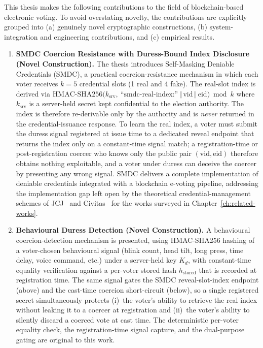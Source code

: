 This thesis makes the following contributions to the field of blockchain-based electronic voting. To avoid overstating novelty, the contributions are explicitly grouped into (a) genuinely novel cryptographic constructions, (b) system-integration and engineering contributions, and (c) empirical results.

\begin{enumerate}
    \item \textbf{SMDC Coercion Resistance with Duress-Bound Index Disclosure (Novel Construction).} The thesis introduces Self-Masking Deniable Credentials (SMDC), a practical coercion-resistance mechanism in which each voter receives $k=5$ credential slots (1 real and 4 fake). The real-slot index is derived via $\text{HMAC-SHA256}\bigl(k_{\text{srv}},\ \text{``smdc-real-index:''} \,\Vert\, \text{vid} \,\Vert\, \text{eid}\bigr) \bmod k$ where $k_{\text{srv}}$ is a server-held secret kept confidential to the election authority. The index is therefore re-derivable only by the authority and is \emph{never} returned in the credential-issuance response. To learn the real index, a voter must submit the duress signal registered at issue time to a dedicated reveal endpoint that returns the index only on a constant-time signal match; a registration-time or post-registration coercer who knows only the public pair $(\text{vid}, \text{eid})$ therefore obtains nothing exploitable, and a voter under duress can deceive the coercer by presenting any wrong signal. SMDC delivers a complete implementation of deniable credentials integrated with a blockchain e-voting pipeline, addressing the implementation gap left open by the theoretical credential-management schemes of JCJ~\cite{jcj2005} and Civitas~\cite{civitas2008} for the works surveyed in Chapter~\ref{ch:related-works}.

    \item \textbf{Behavioural Duress Detection (Novel Construction).} A behavioural coercion-detection mechanism is presented, using HMAC-SHA256 hashing of a voter-chosen behavioural signal (blink count, head tilt, long press, time delay, voice command, etc.) under a server-held key $K_d$, with constant-time equality verification against a per-voter stored hash $h_{\text{stored}}$ that is recorded at registration time. The same signal gates the SMDC reveal-slot-index endpoint (above) and the cast-time coercion short-circuit (below), so a single registered secret simultaneously protects (i)~the voter's ability to retrieve the real index without leaking it to a coercer at registration and (ii)~the voter's ability to silently discard a coerced vote at cast time. The deterministic per-voter equality check, the registration-time signal capture, and the dual-purpose gating are original to this work.


\end{enumerate}
